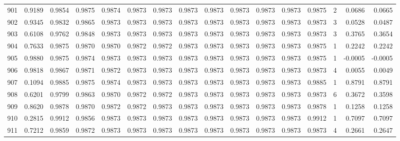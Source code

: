 \begin{tabular}{lrrrrrrrrrrrrrrr}
901 &      0.9189 &  0.9854 &  0.9875 &  0.9874 &  0.9873 &  0.9873 &  0.9873 &  0.9873 &  0.9873 &  0.9873 &   0.9873 &     0.9875 &      2 &                    0.0686 &                     0.0665 \\
902 &      0.9345 &  0.9832 &  0.9865 &  0.9873 &  0.9873 &  0.9873 &  0.9873 &  0.9873 &  0.9873 &  0.9873 &   0.9873 &     0.9873 &      3 &                    0.0528 &                     0.0487 \\
903 &      0.6108 &  0.9762 &  0.9848 &  0.9873 &  0.9873 &  0.9873 &  0.9873 &  0.9873 &  0.9873 &  0.9873 &   0.9873 &     0.9873 &      3 &                    0.3765 &                     0.3654 \\
904 &      0.7633 &  0.9875 &  0.9870 &  0.9870 &  0.9872 &  0.9872 &  0.9873 &  0.9873 &  0.9873 &  0.9873 &   0.9873 &     0.9875 &      1 &                    0.2242 &                     0.2242 \\
905 &      0.9880 &  0.9875 &  0.9874 &  0.9873 &  0.9873 &  0.9873 &  0.9873 &  0.9873 &  0.9873 &  0.9873 &   0.9873 &     0.9875 &      1 &                   -0.0005 &                    -0.0005 \\
906 &      0.9818 &  0.9867 &  0.9871 &  0.9872 &  0.9873 &  0.9873 &  0.9873 &  0.9873 &  0.9873 &  0.9873 &   0.9873 &     0.9873 &      4 &                    0.0055 &                     0.0049 \\
907 &      0.1094 &  0.9885 &  0.9875 &  0.9874 &  0.9873 &  0.9873 &  0.9873 &  0.9873 &  0.9873 &  0.9873 &   0.9873 &     0.9885 &      1 &                    0.8791 &                     0.8791 \\
908 &      0.6201 &  0.9799 &  0.9863 &  0.9870 &  0.9872 &  0.9872 &  0.9873 &  0.9873 &  0.9873 &  0.9873 &   0.9873 &     0.9873 &      6 &                    0.3672 &                     0.3598 \\
909 &      0.8620 &  0.9878 &  0.9870 &  0.9872 &  0.9872 &  0.9873 &  0.9873 &  0.9873 &  0.9873 &  0.9873 &   0.9873 &     0.9878 &      1 &                    0.1258 &                     0.1258 \\
910 &      0.2815 &  0.9912 &  0.9856 &  0.9873 &  0.9873 &  0.9873 &  0.9873 &  0.9873 &  0.9873 &  0.9873 &   0.9873 &     0.9912 &      1 &                    0.7097 &                     0.7097 \\
911 &      0.7212 &  0.9859 &  0.9872 &  0.9873 &  0.9873 &  0.9873 &  0.9873 &  0.9873 &  0.9873 &  0.9873 &   0.9873 &     0.9873 &      4 &                    0.2661 &                     0.2647 \\

\end{tabular}
